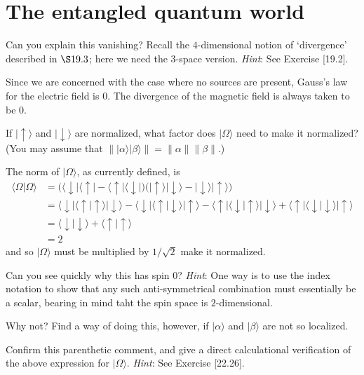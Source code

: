 \documentclass[../road-to-reality.tex]{subfiles}
\begin{document}
	\printanswers
	
	\section{The entangled quantum world}
	
	\begin{questions}
		\question Can you explain this vanishing? Recall the $4$-dimensional notion of `divergence' described in $\S19.3$; here we need the $3$-space version. \textit{Hint}: See Exercise [19.2].
		
		\begin{solution}
			Since we are concerned with the case where no sources are present, Gauss's law for the electric field is $0$. The divergence of the magnetic field is always taken to be $0$.
		\end{solution}
	
		\question If $|\!\uparrow\rangle$ and $|\!\downarrow\rangle$ are normalized, what factor does $|\Omega\rangle$ need to make it normalized? (You may assume that $\||\alpha\rangle|\beta\rangle\|=\|\alpha\|\|\beta\|$.)
		
		\begin{solution}
			The norm of $|\Omega\rangle$, as currently defined, is
			\begin{align*}
				\langle\Omega|\Omega\rangle &= \big(\langle\downarrow\!|\langle\uparrow\!| - \langle\uparrow\!|\langle\downarrow\!|\big)\big(|\!\uparrow\rangle|\!\downarrow\rangle - |\!\downarrow\rangle|\!\uparrow\rangle\big) \\
				&= \langle\downarrow\!|\langle\uparrow\!|\!\uparrow\rangle|\!\downarrow\rangle - \langle\downarrow\!|\langle\uparrow\!|\!\downarrow\rangle|\!\uparrow\rangle - \langle\uparrow\!|\langle\downarrow\!|\!\uparrow\rangle|\!\downarrow\rangle + \langle\uparrow\!|\langle\downarrow\!|\!\downarrow\rangle|\!\uparrow\rangle \\
				&= \langle\downarrow\!|\!\downarrow\rangle + \langle\uparrow\!|\!\uparrow\rangle \\
				&= 2
			\end{align*}
			and so $|\Omega\rangle$ must be multiplied by $1/\sqrt{2}$ make it normalized.
		\end{solution}
	
		\question Can you see quickly why this has spin $0$? \textit{Hint}: One way is to use the index notation to show that any such anti-symmetrical combination must essentially be a scalar, bearing in mind taht the spin space is $2$-dimensional.
		
		\question Why not? Find a way of doing this, however, if $|\alpha\rangle$ and $|\beta\rangle$ are not so localized.
		
		\question Confirm this parenthetic comment, and give a direct calculational verification of the above expression for $|\Omega\rangle$. \textit{Hint}: See Exercise [22.26].
	\end{questions}
\end{document}
